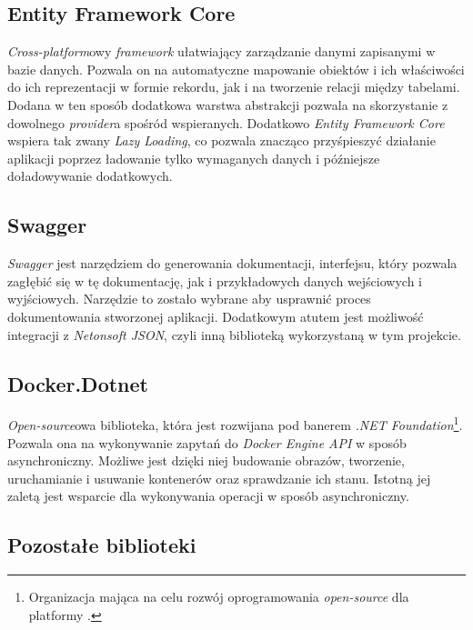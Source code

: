 \subsection{Entity Framework Core}

\par \emph{Cross-platform}owy \emph{framework} ułatwiający zarządzanie danymi zapisanymi w bazie danych. Pozwala on na automatyczne mapowanie obiektów i ich właściwości do ich reprezentacji w formie rekordu, jak i na tworzenie relacji między tabelami. Dodana w ten sposób dodatkowa warstwa abstrakcji pozwala na skorzystanie z dowolnego \emph{provider}a spośród wspieranych. Dodatkowo \emph{Entity Framework Core} wspiera tak zwany \emph{Lazy Loading}, co pozwala znacząco przyśpieszyć działanie aplikacji poprzez ładowanie tylko wymaganych danych i późniejsze doładowywanie dodatkowych.

\subsection{Swagger}
\label{subsec:swagger}

\par \emph{Swagger} jest narzędziem do generowania dokumentacji, interfejsu, który pozwala zagłębić się w tę dokumentację, jak i przykładowych danych wejściowych i wyjściowych. Narzędzie to zostało wybrane aby usprawnić proces dokumentowania stworzonej aplikacji. Dodatkowym atutem jest możliwość integracji z \emph{Netonsoft JSON}, czyli inną biblioteką wykorzystaną w tym projekcie.

\subsection{Docker.Dotnet}

\par \emph{Open-source}owa biblioteka, która jest rozwijana pod banerem \emph{.NET Foundation}\footnote{Organizacja mająca na celu rozwój oprogramowania \emph{open-source} dla platformy \emph{\dotnet{}}.}. Pozwala ona na wykonywanie zapytań do \emph{Docker Engine API} w sposób asynchroniczny. Możliwe jest dzięki niej budowanie obrazów, tworzenie, uruchamianie i usuwanie kontenerów oraz sprawdzanie ich stanu. Istotną jej zaletą jest wsparcie dla wykonywania operacji w sposób asynchroniczny.

\subsection{Pozostałe biblioteki}

